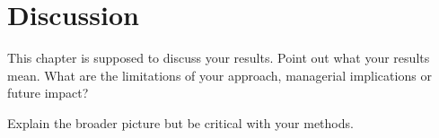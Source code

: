 \chapter{Discussion}
\label{ch:discussion}

This chapter is supposed to discuss your results. Point out what your results mean.
What are the limitations of your approach, managerial implications or future impact?

Explain the broader picture but be critical with your methods.